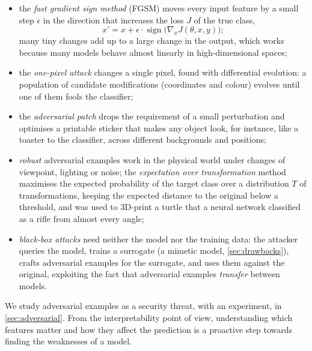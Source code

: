 \begin{itemize}
  \item the \emph{fast gradient sign method} (FGSM) \citep{goodfellow2015explaining} moves every input feature
        by a small step $\epsilon$ in the direction that increases the loss $J$ of the true class,
        \begin{equation}\label{eq:fgsm}
          x'=x+\epsilon\cdot\operatorname{sign}\bigl(\nabla_xJ(\theta,x,y)\bigr);
        \end{equation}
        many tiny changes add up to a large change in the output, which works because many models behave
        almost linearly in high-dimensional spaces;
  \item the \emph{one-pixel attack} \citep{su2019one} changes a single pixel, found with differential
        evolution: a population of candidate modifications (coordinates and colour) evolves until one of
        them fools the classifier;
  \item the \emph{adversarial patch} \citep{brown2017adversarial} drops the requirement of a small
        perturbation and optimises a printable sticker that makes any object look, for instance, like a
        toaster to the classifier, across different backgrounds and positions;
  \item \emph{robust} adversarial examples work in the physical world under changes of viewpoint,
        lighting or noise; the \emph{expectation over transformation} method \citep{athalye2018synthesizing}
        maximises the expected probability of the target class over a distribution $T$ of
        transformations, keeping the expected distance to the original below a threshold, and was used to
        3D-print a turtle that a neural network classified as a rifle from almost every angle;
  \item \emph{black-box attacks} \citep{papernot2017practical} need neither the model nor the training
        data: the attacker queries the model, trains a surrogate (a mimetic model, \cref{sec:drawbacks}),
        crafts adversarial examples for the surrogate, and uses them against the original, exploiting the
        fact that adversarial examples \emph{transfer} between models.
\end{itemize}
We study adversarial examples as a security threat, with an experiment, in \cref{sec:adversarial}.
From the interpretability point of view, understanding which features matter and how they affect the
prediction is a proactive step towards finding the weaknesses of a model.

